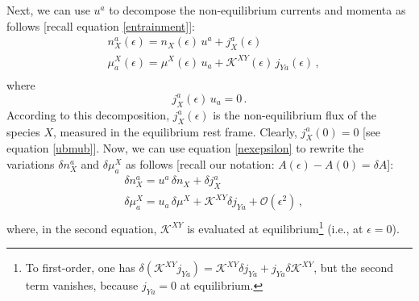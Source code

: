 \documentclass[a4paper, amsfonts, amssymb, amsmath, reprint, showkeys, nofootinbib, twoside, onecolumn,notitlepage]{revtex4-1}
\theoremstyle{definition}
\theoremstyle{theorem}
\begin{document}
Next, we can use $u^a$ to decompose the non-equilibrium currents and momenta as follows [recall equation \eqref{entrainment}]:
\begin{equation}\label{nexepsilon}
\begin{split}
& n_X^a(\epsilon)= n_X(\epsilon) \, u^a + j_X^a(\epsilon) \\
& \mu^X_a(\epsilon)= \mu^X(\epsilon) \, u_a + \mathcal{K}^{XY}(\epsilon) \, j_{Ya}(\epsilon) \, , \\
\end{split}
\end{equation}
where
\begin{equation}
j_X^a(\epsilon) \, u_a =0 \, .
\end{equation}
According to this decomposition, $j_X^a(\epsilon)$ is the non-equilibrium flux of the species $X$, measured in the equilibrium rest frame. Clearly, $j_X^a(0)=0$ [see equation \eqref{ubmub}]. Now, we can use equation \eqref{nexepsilon} to rewrite the variations $\delta n_X^a$ and $\delta \mu^X_a$ as follows [recall our notation: $A(\epsilon)-A(0)= \delta A$]:
\begin{equation}\label{ddnexepsilon}
\begin{split}
& \delta n_X^a=  u^a \, \delta n_X + \delta j_X^a \\
& \delta \mu^X_a= u_a \,  \delta \mu^X  + \mathcal{K}^{XY} \delta j_{Ya} + \mathcal{O}(\epsilon^2) \, , \\
\end{split}
\end{equation} 
where, in the second equation, $\mathcal{K}^{XY}$ is evaluated at equilibrium\footnote{To first-order, one has $\delta (\mathcal{K}^{XY}j_{Ya})=\mathcal{K}^{XY} \delta j_{Ya}  +j_{Ya} \delta \mathcal{K}^{XY}$, but the second term vanishes, because $j_{Ya}=0$ at equilibrium.} (i.e., at $\epsilon=0$).
\end{document}
